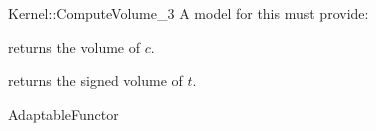 \begin{ccRefFunctionObjectConcept}{Kernel::ComputeVolume_3}
A model for this must provide:


       {returns the volume of $c$. }

       {returns the signed volume of $t$. }

\ccRefines
AdaptableFunctor

\ccSeeAlso

 \\
 \\

\end{ccRefFunctionObjectConcept}
